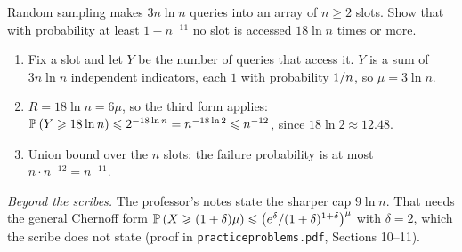 \begin{exercisebox}
\begin{pproblem}\label{wp:maxload}
    Random sampling makes $3n \ln n$ queries into an array of $n \geq 2$ slots. Show that with
    probability at least $1 - n^{-11}$ no slot is accessed $18 \ln n$ times or more.
\end{pproblem}
\tcblower
\begin{wsolution}
    \leavevmode
    \begin{enumerate}
        \item Fix a slot and let $Y$ be the number of queries that access it. $Y$ is a sum of
              $3n \ln n$ independent indicators, each $1$ with probability $1/n$, so
              $\mu = 3 \ln n$.
        \item $R = 18 \ln n = 6\mu$, so the third form applies:
              $\operatorname{\mathbb{P}}\left(Y \geqslant 18 \ln n\right) \leqslant 2^{-18 \ln n} = n^{-18 \ln 2} \leqslant n^{-12}$, since
              $18 \ln 2 \approx 12.48$.
        \item Union bound over the $n$ slots: the failure probability is at most
              $n \cdot n^{-12} = n^{-11}$. \qedhere
    \end{enumerate}
    \emph{Beyond the scribes.} The professor's notes state the sharper cap $9 \ln n$. That needs the
    general Chernoff form
    $\operatorname{\mathbb{P}}\left(X \geqslant (1+\delta)\mu\right) \leqslant \left(e^\delta/(1+\delta)^{1+\delta}\right)^\mu$ with
    $\delta = 2$, which the scribe does not state (proof in \texttt{practiceproblems.pdf},
    Sections 10--11).
\end{wsolution}
\end{exercisebox}

